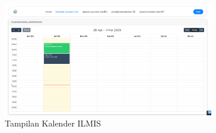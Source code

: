 \begin{figure}
	\centering
	\includegraphics[width=0.82\textwidth]{konten/gambar/hasil/kalender.png}
	\caption{Tampilan Kalender ILMIS}
	\label{fig:kalender}
\end{figure}


